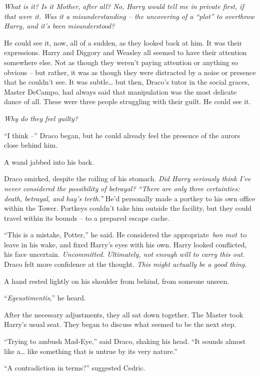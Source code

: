 \emph{What is it? Is it Mother, after all? No, Harry would tell me in
private first, if that were it. Was it a misunderstanding -- the
uncovering of a ``plot'' to overthrow Harry, and it's been
misunderstood?}

He could see it, now, all of a sudden, as they looked back at him. It
was their expressions. Harry and Diggory and Weasley all seemed to have
their attention somewhere else. Not as though they weren't paying
attention or anything so obvious -- but rather, it was as though they
were distracted by a noise or presence that he couldn't see. It was
subtle\ldots{} but then, Draco's tutor in the social graces, Master
DeCampo, had always said that manipulation was the most delicate dance
of all. These were three people struggling with their guilt. He could
see it.

\emph{Why do they feel guilty?}

``I think --'' Draco began, but he could already feel the presence of
the aurors close behind him.

A wand jabbed into his back.

Draco smirked, despite the roiling of his stomach. \emph{Did Harry
seriously think I've never considered the possibility of betrayal?
``There are only three certainties: death, betrayal, and hag's teeth.''}
He'd personally made a portkey to his own office within the Tower.
Portkeys couldn't take him outside the facility, but they could travel
within its bounds -- to a prepared escape cache.

``This is a mistake, Potter,'' he said. He considered the
appropriate~\emph{bon mot}~to leave in his wake, and fixed Harry's eyes
with his own. Harry looked conflicted, his face uncertain.
\emph{Uncommitted. Ultimately, not enough will to carry this out.} Draco
felt more confidence at the thought. \emph{This might actually be a good
thing.}

A hand rested lightly on his shoulder from behind, from someone unseen.

``\emph{Egeustimentis},'' he heard.

\mybreak

After the necessary adjustments, they all sat down together. The Master
took Harry's usual seat. They began to discuss what seemed to be the
next step.

``Trying to ambush Mad-Eye,'' said Draco, shaking his head. ``It sounds
almost like a\ldots{} like something that is untrue by its very
nature.''

``A contradiction in terms?'' suggested Cedric.

